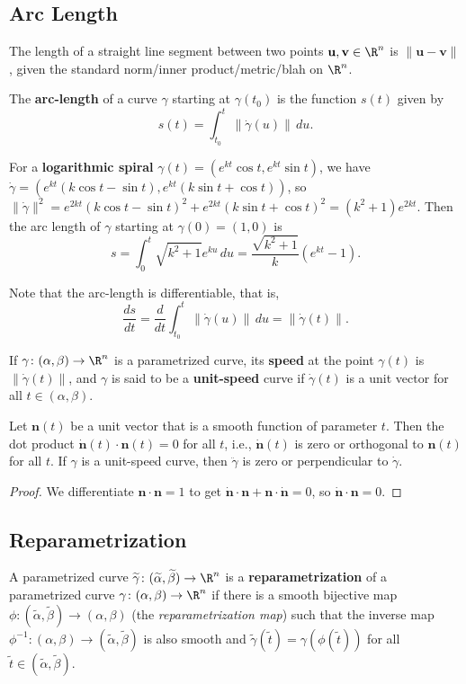 \subsection{Arc Length}
The length of a straight line segment between two points $\mathbf u,\mathbf v \in \R^n $ is $\| \mathbf u-\mathbf v\|$, given the standard norm/inner product/metric/blah on $\R^n $. 
\begin{definition}[]
    The \textbf{arc-length} of a curve $\gamma$ starting at $\gamma(t_0)$ is the function $s(t)$ given by \[
        s(t)= \int_{t_0}^{t} \| \dot\gamma(u)\| \, du.
    \] 
\end{definition}
\begin{example}
    For a \textbf{logarithmic spiral} $\gamma(t)=(e^{kt}\cos t, e^{kt} \sin t)$, we have $\dot \gamma=(e^{kt}(k \cos t- \sin t), e^{kt}(k \sin t + \cos t))$, so $\| \dot \gamma\|^2= e^{2kt}(k \cos t - \sin t) ^2+e^{2kt}(k \sin t + \cos t)^2=(k^2+1)e^{2kt}.$ Then the arc length of $\gamma$ starting at $\gamma(0)=(1,0)$ is \[
        s= \int_{0}^{t} \sqrt{k^2+1} e^{ku} \, du= \frac{\sqrt{k^2+1} }{k}(e^{kt}-1).
    \] 
\end{example}
Note that the arc-length is differentiable, that is,  \[
    \frac{ds}{dt}=\frac{d}{dt}\int_{t_0}^{t} \| \dot\gamma(u)\| \, du = \| \dot\gamma(t)\|.
\] 
\begin{definition}[]
    If $\gamma \colon (\alpha ,\beta ) \to \R^n $ is a parametrized curve, its \textbf{speed} at the point $\gamma(t)$ is $\| \dot\gamma(t)\|$, and $\gamma$ is said to be a \textbf{unit-speed} curve if $\dot \gamma(t)$ is a unit vector for all $t\in (\alpha ,\beta )$.
\end{definition}
\begin{prop}
    Let $\mathbf n(t)$ be a unit vector that is a smooth function of parameter $t$. Then the dot product $\mathbf {\dot n}(t) \cdot \mathbf n(t)=0 $ for all $t$, i.e., $\mathbf {\dot n}(t)$ is zero or orthogonal to $\mathbf n(t)$ for all $t$. If $\gamma$ is a unit-speed curve, then $\ddot \gamma$ is zero or perpendicular to $\dot \gamma$.
\end{prop}
\begin{proof}
    We differentiate $\mathbf n \cdot \mathbf n=1$ to get $\mathbf {\dot n} \cdot \mathbf n+ \mathbf n\cdot \mathbf {\dot n}=0$, so $\mathbf {\dot n}\cdot \mathbf n=0$.
\end{proof}

\subsection{Reparametrization}
A parametrized curve $\widetilde {\gamma} \colon (\widetilde {\alpha }, \widetilde {\beta } )\to \R^n $ is a \textbf{reparametrization} of a parametrized curve $\gamma \colon (\alpha ,\beta ) \to \R^n $ if there is a smooth bijective map $\phi \colon (\widetilde {\alpha },\widetilde {\beta })\to (\alpha ,\beta )$ (the \emph{reparametrization map}) such that the inverse map $\phi ^{-1} \colon (\alpha ,\beta ) \to (\widetilde {\alpha },\widetilde {\beta })$ is also smooth and $\widetilde {\gamma} (\widetilde t)=\gamma(\phi (\widetilde t))$ for all $\widetilde t \in (\widetilde {\alpha },\widetilde {\beta })$.

